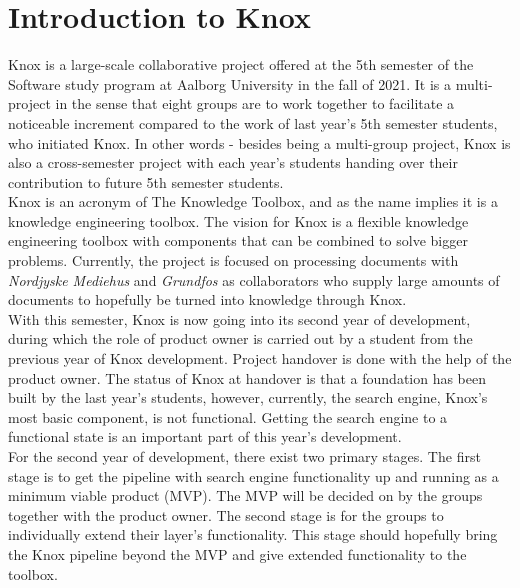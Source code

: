 \chapter{Introduction to Knox}\label{introduction_to_knox}

Knox is a large-scale collaborative project offered at the 5th semester of the Software study program at Aalborg University in the fall of 2021. It is a multi-project in the sense that eight groups are to work together to facilitate a noticeable increment compared to the work of last year's 5th semester students, who initiated Knox. In other words - besides being a multi-group project, Knox is also a cross-semester project with each year's students handing over their contribution to future 5th semester students.\\

Knox is an acronym of The Knowledge Toolbox, and as the name implies it is a knowledge engineering toolbox. The vision for Knox is a flexible knowledge engineering toolbox with components that can be combined to solve bigger problems. Currently, the project is focused on processing documents with \textit{Nordjyske Mediehus} and \textit{Grundfos} as collaborators who supply large amounts of documents to hopefully be turned into knowledge through Knox.\\

With this semester, Knox is now going into its second year of development, during which the role of product owner is carried out by a student from the previous year of Knox development. Project handover is done with the help of the product owner. The status of Knox at handover is that a foundation has been built by the last year's students, however, currently, the search engine, Knox's most basic component, is not functional. Getting the search engine to a functional state is an important part of this year's development.\\

For the second year of development, there exist two primary stages.
The first stage is to get the pipeline with search engine functionality up and running as a minimum viable product (MVP). The MVP will be decided on by the groups together with the product owner. The second stage is for the groups to individually extend their layer's functionality. This stage should hopefully bring the Knox pipeline beyond the MVP and give extended functionality to the toolbox.\\

